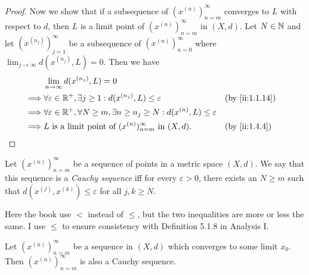 \begin{proof}
  Now we show that if a subsequence of \((x^{(n)})_{n = m}^\infty\) converges to \(L\) with respect to \(d\), then \(L\) is a limit point of \((x^{(n)})_{n = m}^\infty\) in \((X, d)\).
  Let \(N \in \mathbb{N}\) and let \((x^{(n_j)})_{j = 1}^\infty\) be a subsequence of \((x^{(n)})_{n = 0}^\infty\) where \(\lim_{j \to \infty} d(x^{(n_j)}, L) = 0\).
  Then we have
  \begin{align*}
             & \lim_{n \to \infty} d(x^{(n_j)}, L) = 0                                                                                      \\
    \implies & \forall \varepsilon \in \R^+, \exists j \geq 1 : d(x^{(n_j)}, L) \leq \varepsilon                           &  & \by{ii:1.1.14} \\
    \implies & \forall \varepsilon \in \R^+,  \forall N \geq m, \exists n \geq n_j \geq N : d(x^{(n)}, L) \leq \varepsilon                  \\
    \implies & L \text{ is a limit point of } (x^{(n)})_{n = m}^\infty \text{ in } (X, d).                                 &  & \by{ii:1.4.4}
  \end{align*}
\end{proof}

\begin{defn}\label{ii:1.4.6}
  Let \((x^{(n)})_{n = m}^\infty\) be a sequence of points in a metric space \((X, d)\).
  We say that this sequence is a \emph{Cauchy sequence} iff for every \(\varepsilon > 0\), there exists an \(N \geq m\) such that \(d(x^{(j)}, x^{(k)}) \leq \varepsilon\) for all \(j, k \geq N\).
\end{defn}

\begin{note}
  Here the book use \(<\) instead of \(\leq\), but the two inequalities are more or less the same.
  I use \(\leq\) to ensure consistency with Definition 5.1.8 in Analysis I.
\end{note}

\begin{lem}\label{ii:1.4.7}
  Let \((x^{(n)})_{n = m}^\infty\) be a sequence in \((X, d)\) which converges to some limit \(x_0\).
  Then \((x^{(n)})_{n = m}^\infty\) is also a Cauchy sequence.
\end{lem}

